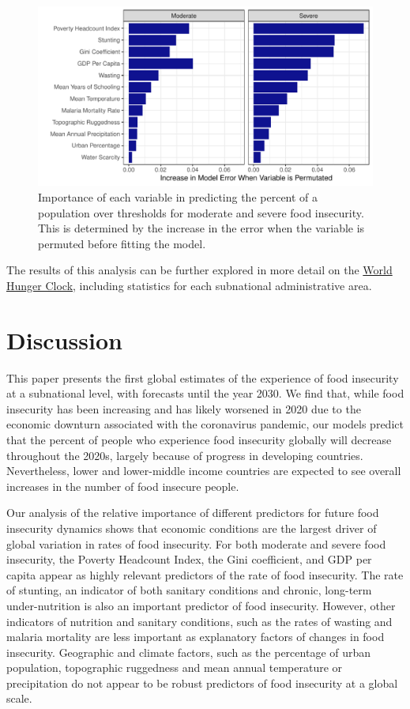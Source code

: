 \documentclass{article}
\begin{document}
\begin{figure}[h]
  \centering
  \includegraphics[width=\linewidth]{img/VIMP.pdf}
  \caption{Importance of each variable in predicting the percent of a population over thresholds for moderate and severe food insecurity.  This is determined by the increase in the error when the variable is permuted before fitting the model.}
  \label{fig:map}
\end{figure}

The results of this analysis can be further explored in more detail on the \href{https://worldhunger.io}{World Hunger Clock}, including statistics for each subnational administrative area.

\section{Discussion}
This paper presents the first global estimates of the experience of food insecurity at a subnational level, with forecasts until the year 2030.  We find that, while food insecurity has been increasing and has likely worsened in 2020 due to the economic downturn associated with the coronavirus pandemic, our models predict that the percent of people who experience food insecurity globally will decrease throughout the 2020s, largely because of progress in developing countries.  Nevertheless, lower and lower-middle income countries are expected to see overall increases in the number of food insecure people. 

Our analysis of the relative importance of different predictors for future food insecurity dynamics shows that economic conditions are the largest driver of global variation in rates of food insecurity. For both moderate and severe food insecurity, the Poverty Headcount Index, the Gini coefficient, and GDP per capita appear as highly relevant predictors of the rate of food insecurity. The rate of stunting, an indicator of both sanitary conditions and chronic, long-term under-nutrition is also an important predictor of food insecurity. However, other indicators of nutrition and sanitary conditions, such as the rates of wasting and malaria mortality are less important as explanatory factors of changes in food insecurity. Geographic and climate factors, such as the percentage of urban population, topographic ruggedness and mean annual temperature or precipitation do not appear to be robust predictors of food insecurity at a global scale. 
\end{document}
